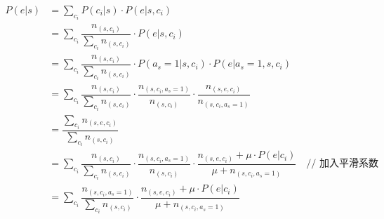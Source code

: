 \begin{align}
P(e|s)
&= \sum\limits_{c_i} P(c_i|s) \cdot P(e|s,c_i) \\
&= \sum\limits_{c_i} \dfrac {n_{(s,c_i)}} {\sum\limits_{c_i} n_{(s,c_i)}} \cdot P(e|s,c_i) \\
&= \sum\limits_{c_i} \dfrac {n_{(s,c_i)}} {\sum\limits_{c_i} n_{(s,c_i)}} \cdot P(a_{s}=1|s,c_i) \cdot P(e|a_{s}=1,s,c_i) \\
&= \sum\limits_{c_i} \dfrac {n_{(s,c_i)}} {\sum\limits_{c_i} n_{(s,c_i)}} \cdot \dfrac{n_{(s,c_i,a_{s}=1)}}{n_{(s,c_i)}} \cdot \dfrac{n_{(s,e,c_i)}}{n_{(s,c_i,a_{s}=1)}} \\
&= \dfrac {\sum\limits_{c_i} n_{(s,e,c_i)}} {\sum\limits_{c_i} n_{(s,c_i)}} \\
&= \sum\limits_{c_i} \dfrac {n_{(s,c_i)}} {\sum\limits_{c_i} n_{(s,c_i)}} \cdot \dfrac{n_{(s,c_i,a_{s}=1)}}{n_{(s,c_i)}} \cdot \dfrac{n_{(s,e,c_i)} + \mu \cdot P(e|c_i)}{\mu + n_{(s,c_i,a_{s}=1)}} \quad \textrm{// 加入平滑系数} \\
&= \sum\limits_{c_i} \dfrac {n_{(s,c_i,a_{s}=1)}} {\sum\limits_{c_i} n_{(s,c_i)}} \cdot \dfrac{n_{(s,e,c_i)} + \mu \cdot P(e|c_i)}{\mu + n_{(s,c_i,a_{s}=1)}}
\end{align}